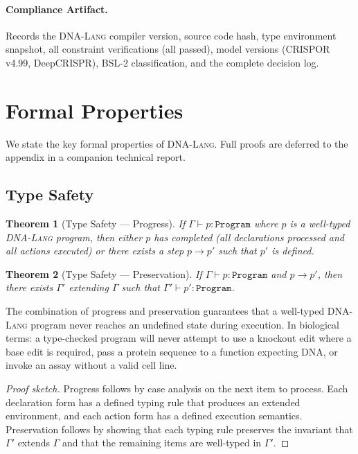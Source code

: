 \documentclass[12pt,a4paper]{article}
\newtheorem{theorem}{Theorem}[section]
\newcommand{\DNALang}{\textsc{DNA-Lang}}
\newcommand{\ty}[1]{\texttt{#1}}
\begin{document}
\paragraph{Compliance Artifact.} Records the \DNALang{} compiler version, source code hash, type environment snapshot, all constraint verifications (all passed), model versions (CRISPOR v4.99, DeepCRISPR), BSL-2 classification, and the complete decision log.


\section{Formal Properties}
\label{sec:formal}

We state the key formal properties of \DNALang{}. Full proofs are deferred to the appendix in a companion technical report.

\subsection{Type Safety}

\begin{theorem}[Type Safety --- Progress]
\label{thm:progress}
If $\Gamma \vdash p : \ty{Program}$ where $p$ is a well-typed \DNALang{} program, then either $p$ has completed (all declarations processed and all actions executed) or there exists a step $p \to p'$ such that $p'$ is defined.
\end{theorem}

\begin{theorem}[Type Safety --- Preservation]
\label{thm:preservation}
If $\Gamma \vdash p : \ty{Program}$ and $p \to p'$, then there exists $\Gamma'$ extending $\Gamma$ such that $\Gamma' \vdash p' : \ty{Program}$.
\end{theorem}

The combination of progress and preservation guarantees that a well-typed \DNALang{} program never reaches an undefined state during execution. In biological terms: a type-checked program will never attempt to use a knockout edit where a base edit is required, pass a protein sequence to a function expecting DNA, or invoke an assay without a valid cell line.

\begin{proof}[Proof sketch]
Progress follows by case analysis on the next item to process. Each declaration form has a defined typing rule that produces an extended environment, and each action form has a defined execution semantics. Preservation follows by showing that each typing rule preserves the invariant that $\Gamma'$ extends $\Gamma$ and that the remaining items are well-typed in $\Gamma'$.
\end{proof}
\end{document}
